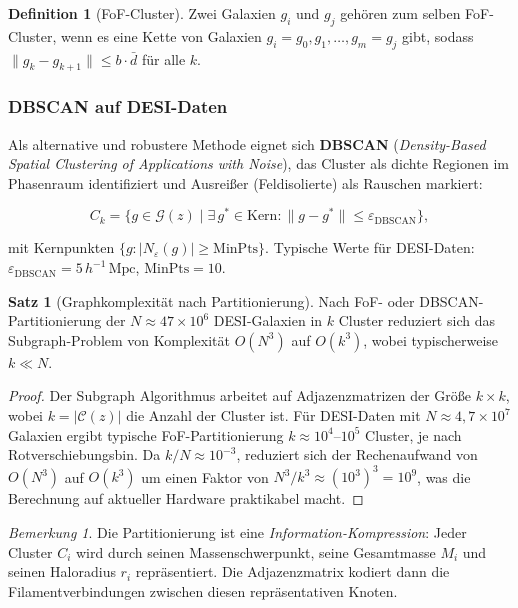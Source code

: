 ﻿\documentclass[a4paper,12pt]{article}
\theoremstyle{definition}
\newtheorem{definition}{Definition}[section]
\newtheorem{satz}{Satz}[section]
\theoremstyle{remark}
\newtheorem{bemerkung}{Bemerkung}[section]
\begin{document}
\begin{definition}[FoF-Cluster]
  Zwei Galaxien $g_i$ und $g_j$ gehören zum selben FoF-Cluster, wenn es eine
  Kette von Galaxien $g_i = g_0, g_1, \ldots, g_m = g_j$ gibt, sodass
  $\|g_k - g_{k+1}\| \leq b\cdot\bar{d}$ für alle $k$.
\end{definition}

\subsubsection*{DBSCAN auf DESI-Daten}

Als alternative und robustere Methode eignet sich \textbf{DBSCAN}
(\textit{Density-Based Spatial Clustering of Applications with Noise}),
das Cluster als dichte Regionen im Phasenraum identifiziert und
Ausreißer (Feldisolierte) als Rauschen markiert:

\begin{equation}
  \label{eq:dbscan}
  C_k = \bigl\{g \in \mathcal{G}(z) \mid \exists\,g^* \in \text{Kern}:
        \|g - g^*\| \leq \varepsilon_\mathrm{DBSCAN}\bigr\},
\end{equation}

mit Kernpunkten $\{g : |N_\varepsilon(g)| \geq \mathrm{MinPts}\}$.
Typische Werte für DESI-Daten: $\varepsilon_\mathrm{DBSCAN} = 5\,h^{-1}\,\mathrm{Mpc}$,
$\mathrm{MinPts} = 10$.

\begin{satz}[Graphkomplexität nach Partitionierung]
  \label{satz:graph_complexity}
  Nach FoF- oder DBSCAN-Partitionie\-rung der $N \approx 47 \times 10^6$ DESI-Galaxien
  in $k$ Cluster reduziert sich das Subgraph-Problem von Komplexität
  $O(N^3)$ auf $O(k^3)$, wobei typischerweise
  $k \ll N$.
\end{satz}

\begin{proof}
  Der Subgraph Algorithmus \cite{eppsubgraph2026} arbeitet auf Adjazenzmatrizen
  der Größe $k \times k$, wobei $k = |\mathcal{C}(z)|$ die Anzahl der Cluster ist.
  Für DESI-Daten mit $N \approx 4{,}7 \times 10^7$ Galaxien ergibt typische
  FoF-Partitionierung $k \approx 10^4$--$10^5$ Cluster, je nach Rotverschiebungsbin.
  Da $k/N \approx 10^{-3}$, reduziert sich der Rechenaufwand von $O(N^3)$
  auf $O(k^3)$ um einen Faktor von $N^3/k^3 \approx (10^3)^3 = 10^9$, was die
  Berechnung auf aktueller Hardware praktikabel macht.
\end{proof}

\begin{bemerkung}
  Die Partitionierung ist eine \textit{Information-Kompression}: Jeder Cluster
  $C_i$ wird durch seinen Massenschwerpunkt, seine Gesamtmasse $M_i$ und
  seinen Haloradius $r_i$ repräsentiert. Die Adjazenzmatrix kodiert dann
  die Filamentverbindungen zwischen diesen repräsentativen Knoten.
\end{bemerkung}
\end{document}
